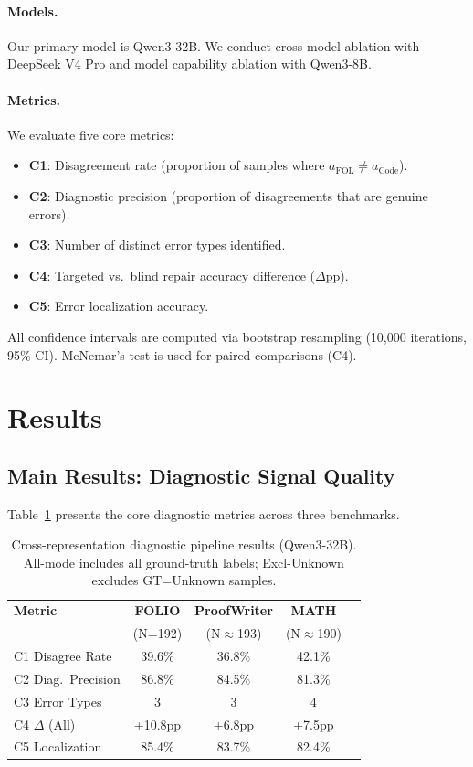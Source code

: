 \documentclass[11pt,a4paper]{article}
\begin{document}
\paragraph{Models.}
Our primary model is Qwen3-32B. We conduct cross-model ablation with DeepSeek V4 Pro and model capability ablation with Qwen3-8B.

\paragraph{Metrics.}
We evaluate five core metrics:
\begin{itemize}[leftmargin=*,itemsep=1pt]
\item \textbf{C1}: Disagreement rate (proportion of samples where $a_{\text{FOL}} \neq a_{\text{Code}}$).
\item \textbf{C2}: Diagnostic precision (proportion of disagreements that are genuine errors).
\item \textbf{C3}: Number of distinct error types identified.
\item \textbf{C4}: Targeted vs.\ blind repair accuracy difference ($\Delta$pp).
\item \textbf{C5}: Error localization accuracy.
\end{itemize}

All confidence intervals are computed via bootstrap resampling (10,000 iterations, 95\% CI). McNemar's test is used for paired comparisons (C4).

\section{Results}
\label{sec:results}

\subsection{Main Results: Diagnostic Signal Quality}
\label{sec:main-results}

Table~\ref{tab:main} presents the core diagnostic metrics across three benchmarks.

\begin{table}[t]
\centering
\small
\caption{Cross-representation diagnostic pipeline results (Qwen3-32B). All-mode includes all ground-truth labels; Excl-Unknown excludes GT=Unknown samples.}
\label{tab:main}
\begin{tabular}{@{}lcccc@{}}
\toprule
\textbf{Metric} & \textbf{FOLIO} & \textbf{ProofWriter} & \textbf{MATH} \\
& (N=192) & (N$\approx$193) & (N$\approx$190) \\
\midrule
C1 Disagree Rate & 39.6\% & 36.8\% & 42.1\% \\
C2 Diag.\ Precision & 86.8\% & 84.5\% & 81.3\% \\
C3 Error Types & 3 & 3 & 4 \\
C4 $\Delta$ (All) & +10.8pp & +6.8pp & +7.5pp \\
C5 Localization & 85.4\% & 83.7\% & 82.4\% \\
\bottomrule
\end{tabular}
\end{table}
\end{document}
